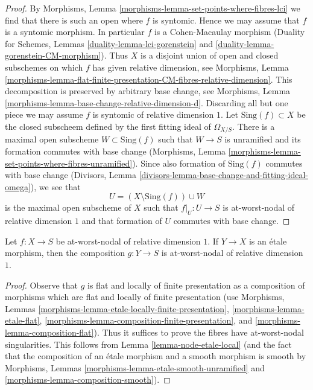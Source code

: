 \begin{proof}
By Morphisms, Lemma \ref{morphisms-lemma-set-points-where-fibres-lci}
we find that there is such an open where $f$ is syntomic.
Hence we may assume that $f$ is a syntomic morphism.
In particular $f$ is a Cohen-Macaulay morphism
(Duality for Schemes, Lemmas \ref{duality-lemma-lci-gorenstein} and
\ref{duality-lemma-gorenstein-CM-morphism}).
Thus $X$ is a disjoint union of open and closed subschemes on which
$f$ has given relative dimension, see Morphisms, Lemma
\ref{morphisms-lemma-flat-finite-presentation-CM-fibres-relative-dimension}.
This decomposition is preserved by arbitrary base change, see
Morphisms, Lemma \ref{morphisms-lemma-base-change-relative-dimension-d}.
Discarding all but one piece we may assume $f$ is syntomic of
relative dimension $1$. Let $\text{Sing}(f) \subset X$ be the
closed subscheem defined by the first fitting ideal of
$\Omega_{X/S}$. There is a maximal open subscheme
$W \subset \text{Sing}(f)$ such that $W \to S$ is unramified
and its formation commutes with base change
(Morphisms, Lemma \ref{morphisms-lemma-set-points-where-fibres-unramified}).
Since also formation of $\text{Sing}(f)$ commutes with base change
(Divisors, Lemma
\ref{divisors-lemma-base-change-and-fitting-ideal-omega}),
we see that
$$
U = (X \setminus \text{Sing}(f)) \cup W
$$
is the maximal open subscheme of $X$ such that
$f|_U : U \to S$ is at-worst-nodal of relative dimension $1$
and that formation of $U$ commutes with base change.
\end{proof}

\begin{lemma}
\label{lemma-nodal-family-precompose-etale}
Let $f : X \to S$ be at-worst-nodal of relative dimension $1$.
If $Y \to X$ is an \'etale morphism, then the composition $g : Y \to S$
is at-worst-nodal of relative dimension $1$.
\end{lemma}

\begin{proof}
Observe that $g$ is flat and locally of finite presentation as
a composition of morphisms which are flat and locally of finite
presentation (use
Morphisms, Lemmas \ref{morphisms-lemma-etale-locally-finite-presentation},
\ref{morphisms-lemma-etale-flat},
\ref{morphisms-lemma-composition-finite-presentation}, and
\ref{morphisms-lemma-composition-flat}).
Thus it suffices to prove the fibres have at-worst-nodal singularities.
This follows from Lemma \ref{lemma-node-etale-local}
(and the fact that the composition of an \'etale morphism and
a smooth morphism is smooth by
Morphisms, Lemmas \ref{morphisms-lemma-etale-smooth-unramified} and
\ref{morphisms-lemma-composition-smooth}).
\end{proof}

